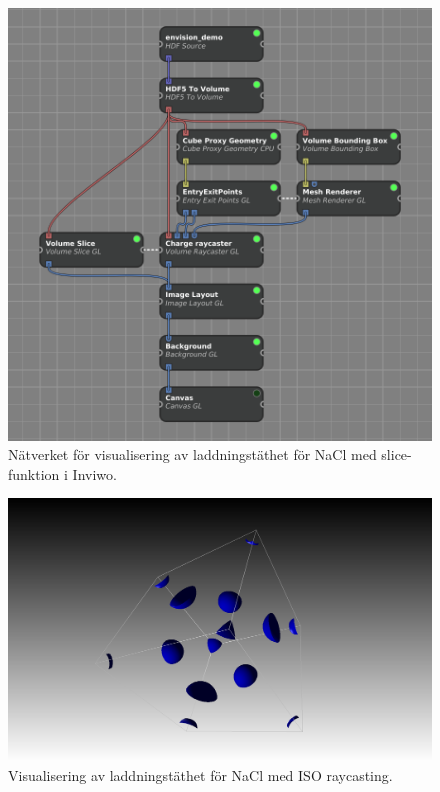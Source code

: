 \documentclass[a4paper,12pt]{article}
\begin{document}
\begin{figure} [H]
\centering
\includegraphics[scale=0.4]{screenshot_NaCl_laddningstathetslicenatverk.png}
\caption{Nätverket för visualisering av laddningstäthet för NaCl med slice-funktion i Inviwo.}
\label{fig:screenshot_NaCl_laddningstathetslicenatverk}
\end{figure}

\begin{figure} [H]
\centering
\includegraphics[scale=0.3]{screenshot_NaCl_laddningstathet_iso.png}
\caption{Visualisering av laddningstäthet för NaCl med ISO raycasting.}
\label{fig:screenshot_NaCl_laddningstathet_iso}
\end{figure}
\end{document}
